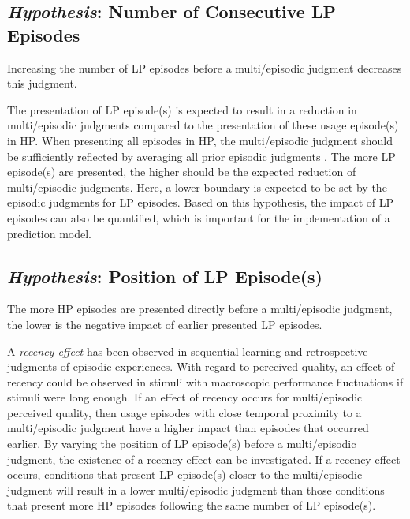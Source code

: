 \subsection[H1: Number of Consecutive \acs{LP} Episodes]{\emph{Hypothesis}: Number of Consecutive \acs{LP} Episodes}
\begin{hypothesis}\label{hypo:number}
Increasing the number of \ac{LP} episodes before a multi\-/episodic judgment decreases this judgment.
\end{hypothesis}

The presentation of \ac{LP} episode(s) is expected to result in a reduction in multi\-/episodic judgments compared to the presentation of these usage episode(s) in \ac{HP}.
When presenting all episodes in \ac{HP}, the multi\-/episodic judgment should be sufficiently reflected by averaging all prior episodic judgments \citep[\cf{}][]{moller_single-call_2011}.
The more \ac{LP} episode(s) are presented, the higher should be the expected reduction of multi\-/episodic judgments.
Here, a lower boundary is expected to be set by the episodic judgments for \ac{LP} episodes.
Based on this hypothesis, the impact of \ac{LP} episodes can also be quantified, which is important for the implementation of a prediction model.


\subsection[H2: Position of \acs{LP} Episode(s)]{\emph{Hypothesis}: Position of \acs{LP} Episode(s)}
\begin{hypothesis}\label{hypo:position}
The more \ac{HP} episodes are presented directly before a multi\-/episodic judgment, the lower is the negative impact of earlier presented \ac{LP} episodes.
\end{hypothesis}

A \emph{recency effect} has been observed in sequential learning and retrospective judgments of episodic experiences.
With regard to perceived quality, an effect of recency could be observed in stimuli with macroscopic performance fluctuations if stimuli were long enough.
If an effect of recency occurs for multi\-/episodic perceived quality, then usage episodes with close temporal proximity to a multi\-/episodic judgment have a higher impact than episodes that occurred earlier.
By varying the position of \ac{LP} episode(s) before a multi\-/episodic judgment, the existence of a recency effect can be investigated.
If a recency effect occurs, conditions that present \ac{LP} episode(s) closer to the multi\-/episodic judgment will result in a lower multi\-/episodic judgment than those conditions that present more \ac{HP} episodes following the same number of \ac{LP} episode(s).

